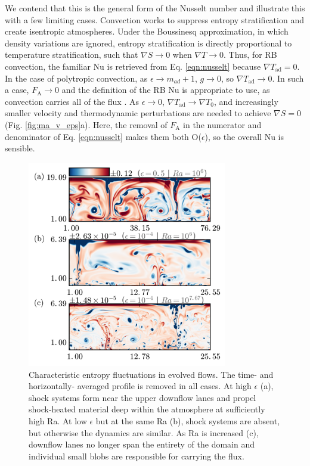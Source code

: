 \documentclass[aps, prl, twocolumn, nofootinbib, groupedaddress, amsfonts, amssymb, amsmath]{revtex4-1}
\newcommand{\grad}{\ensuremath{\nabla}}
\begin{document}
We contend that this is the general form of the Nusselt number and illustrate this with a few limiting
cases. Convection works to
suppress entropy stratification and create isentropic atmospheres.  Under the Boussinesq approximation,
in which density variations are ignored, entropy stratification is directly proportional to temperature stratification,
such that $\grad S \rightarrow 0$ when $\grad T \rightarrow 0$.  Thus, for RB convection, the familiar Nu is
retrieved from Eq. \ref{eqn:nusselt} because $\grad T_{\text{ad}} = 0$.  
In the case of polytropic convection,
as $\epsilon \rightarrow m_{ad} + 1$, $g \rightarrow 0$, so
$\grad T_{\text{ad}} \rightarrow 0$.  In such a case, $F_{\text{A}} \rightarrow 0$ and the
definition of the RB Nu is appropriate to use, as convection carries all of the
flux \cite{brandenburg&all2005}. As $\epsilon \rightarrow 0$, 
$\grad T_{\text{ad}}\rightarrow \grad T_0$, and increasingly
smaller velocity and thermodynamic perturbations are needed to achieve $\grad S = 0$ (Fig. \ref{fig:ma_v_eps}a).
Here, the removal of $F_{\text{A}}$ in the numerator and denominator of Eq. \ref{eqn:nusselt} makes them both
O($\epsilon$), so the overall Nu is sensible.

\begin{figure}[b]
\includegraphics[width=3.4375in]{./figs/snapshots_fig.png}
\caption{Characteristic entropy fluctuations in evolved flows. The time- and horizontally-
averaged profile is removed in all cases.  At high
$\epsilon$ (a), shock systems form near the upper downflow lanes and propel shock-heated material deep within
the atmosphere at sufficiently high Ra.  At low $\epsilon$ but at the same Ra (b), shock systems are absent, 
but otherwise the dynamics are similar.  As Ra is increased (c), downflow lanes no longer span
the entirety of the domain and individual small blobs are responsible for carrying the flux.
\label{fig:entropy_snapshots} }
\end{figure}
\end{document}
